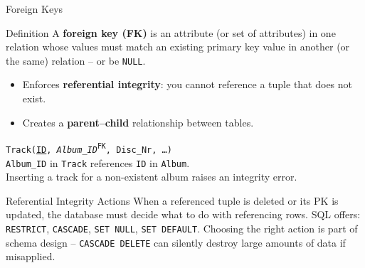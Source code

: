 \begin{frame}{Foreign Keys}
  \begin{block}{Definition}
    A \textbf{foreign key (FK)} is an attribute (or set of attributes)
    in one relation whose values must match an existing primary key value
    in another (or the same) relation -- or be \texttt{NULL}.
    \begin{itemize}
      \item Enforces \textbf{referential integrity}: you cannot reference
            a tuple that does not exist.
      \item Creates a \textbf{parent--child} relationship between tables.
    \end{itemize}
  \end{block}

  \begin{examples}{}
    \texttt{Track(\underline{ID}, \textit{Album\_ID}\textsuperscript{FK}, Disc\_Nr, \ldots)}\\[4pt]
    \texttt{Album\_ID} in \texttt{Track} references \texttt{ID} in \texttt{Album}.\\
    Inserting a track for a non-existent album raises an integrity error.
  \end{examples}

  \begin{alertblock}{Referential Integrity Actions}
    When a referenced tuple is deleted or its PK is updated, the database
    must decide what to do with referencing rows.  SQL offers:
    \texttt{RESTRICT}, \texttt{CASCADE}, \texttt{SET NULL}, \texttt{SET DEFAULT}.
    Choosing the right action is part of schema design -- \texttt{CASCADE DELETE}
    can silently destroy large amounts of data if misapplied.
  \end{alertblock}
\end{frame}

